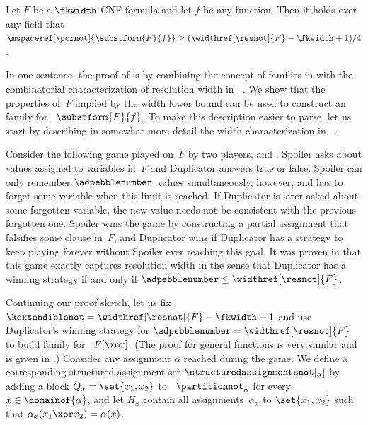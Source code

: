 \begin{theorem}
  \label{thm:substitution}
  Let $F$ be a $\fkwidth$-CNF formula
  and let $f$ be any
  \nonauthor{} function. 
  Then it  holds over any field that
  $\mspaceref[\pcrnot]{\substform{F}{f}}
  \geq
  (\widthref[\resnot]{F} -  \fkwidth  + 1) /  4$.

\end{theorem}

\begin{ourproof}[sketch]
  In one sentence, the proof of
  is by combining the concept of
  \kextendibleNok families in
  with the combinatorial  characterization of resolution width in~%
  \cite{AD08CombinatoricalCharacterization}.
  We show that the  properties of~$F$ implied by the
  width lower bound  can be used to construct an \kextendibleNok family for~%
  $\substform{F}{f}$.
  To make this description easier to parse,
  let us start by describing in somewhat more detail the width
  characterization in~%
  \cite{AD08CombinatoricalCharacterization}.
  
  Consider the following game played on~$F$
  by two players, %
   and . 
  Spoiler asks about values assigned to variables in~$F$ and
  Duplicator answers true or false. Spoiler can only remember 
  $\adpebblenumber$~values
  simultaneously, however, and has to forget some variable when this limit is 
  reached.
  If Duplicator is later asked about some forgotten variable,
  the new value needs not be consistent with the previous
  forgotten one. Spoiler wins the game by constructing a partial
  assignment that falsifies some clause in~$F$, and
  Duplicator wins 
  if %
  Duplicator has  %
  a strategy to keep playing forever without
  Spoiler ever reaching this goal. It was proven in
  \cite{AD08CombinatoricalCharacterization}
  that this game exactly captures resolution
  width in the sense that Duplicator has a winning strategy if and only if
  $\adpebblenumber \leq \widthref[\resnot]{F}$.

  Continuing our proof sketch, let us fix
  $\kextendiblenot=\widthref[\resnot]{F} - \fkwidth + 1$
  and  use Duplicator's winning strategy for
  $\adpebblenumber = \widthref[\resnot]{F}$
  to build \akextendible family for~%
  $F[\xor]$.  (The proof  %
  for general \nonauthor{} functions is very similar and is given in
   .)   %
  Consider any assignment $\alpha$ reached during the
  game. We define a corresponding structured assignment set
  $\structuredassignmentsnot[_\alpha]$
  by adding a block
  $Q_{x}=\set{x_{1},x_{2}}$
  to~%
%
  $\partitionnot_\alpha$
  for every $x \in \domainof{\alpha}$,
  and let $H_{x}$ 
  contain all assignments~$\alpha_x$ to
  $\set{x_{1},x_{2}}$
  such that
  $\alpha_x (x_1 \xor x_2)  =  \alpha(x)$.


\end{ourproof}
